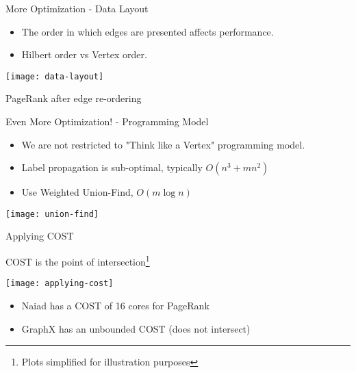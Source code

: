 \begin{frame}[t]{More Optimization - Data Layout}
  \begin{itemize}
    \item The order in which edges are presented affects performance.
    \item Hilbert order vs Vertex order.
  \end{itemize}

  \pause

  \vspace{0.5cm}
  \begin{center}
    \texttt{[image: data-layout]}
    \caption{PageRank after edge re-ordering}
  \end{center}
\end{frame}

\begin{frame}[t]{Even More Optimization! - Programming Model}
  \begin{itemize}
    \item We are not restricted to "Think like a Vertex" programming model.
    \item Label propagation is sub-optimal, typically $O(n^3 + mn^2)$
    \item Use Weighted Union-Find, $O(m \log{n})$
  \end{itemize}

  \pause

  \vspace{0.5cm}
  \begin{center}
    \texttt{[image: union-find]}
  \end{center}
\end{frame}

\begin{frame}[t]{Applying COST}

  \vspace{0.25cm}

  COST is the point of intersection\footnote{Plots simplified for illustration purposes}

  \begin{center}
    \texttt{[image: applying-cost]}
  \end{center}

  \pause

  \begin{itemize}
    \item Naiad has a COST of 16 cores for PageRank
    \item GraphX has an unbounded COST (does not intersect)
  \end{itemize}
\end{frame}